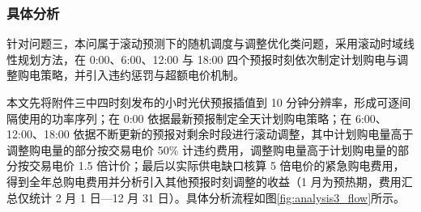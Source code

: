 
\subsubsection{具体分析}

针对问题三，本问属于滚动预测下的随机调度与调整优化类问题，采用滚动时域线性规划方法，在 0:00、6:00、12:00 与 18:00 四个预报时刻依次制定计划购电与调整购电策略，并引入违约惩罚与超额电价机制。

本文先将附件三中四时刻发布的小时光伏预报插值到 10 分钟分辨率，形成可逐间隔使用的功率序列；在 0:00 依据最新预报制定全天计划购电策略；在 6:00、12:00、18:00 依据不断更新的预报对剩余时段进行滚动调整，其中计划购电量高于调整购电量的部分按交易电价 50\% 计违约费用，调整购电量高于计划购电量的部分按交易电价 1.5 倍计价；最后以实际供电缺口核算 5 倍电价的紧急购电费用，得到全年总购电费用并分析引入其他预报时刻调整的收益（1 月为预热期，费用汇总仅统计 2 月 1 日—12 月 31 日）。具体分析流程如图\ref{fig:analysis3_flow}所示。


